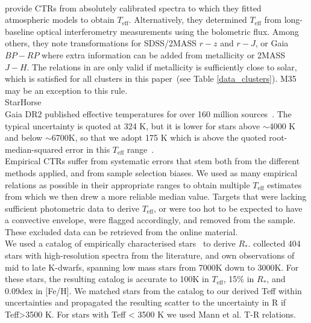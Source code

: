 \documentclass{aa}
\begin{document}
\\
\citet{mann_how_2015} provide CTRs from absolutely calibrated spectra to which they fitted atmospheric models to obtain $T_\mathrm{eff}$. Alternatively, they determined $T_\mathrm{eff}$ from long-baseline optical interferometry measurements using the bolometric flux. Among others, they note transformations for SDSS/2MASS $r-z$ and $r-J$, or Gaia $BP-RP$ where extra information can be added from metallicity or 2MASS $J-H$. The relations in \citet{mann_how_2015} are only valid if metallicity is sufficiently close to solar, which is satisfied for all clusters in this paper~(see Table \ref{data_clusters}). M35 may be an exception to this rule.
\\
StarHorse
\\
Gaia DR2 published effective temperatures for over 160 million sources~\citep{gaia_dr2_release_2018}. The typical uncertainty is quoted at 324 K, but it is lower for stars above $\sim$4000 K and below $\sim$6700K, so that we adopt 175 K which is above the quoted root-median-squared error in this $T_\mathrm{eff}$ range~\citep{andrae_gaiaapsis_2018}.
\\
Empirical CTRs suffer from systematic errors that stem both from the different methods applied, and from sample selection biases. We used as many empirical relations as possible in their appropriate ranges to obtain multiple $T_\mathrm{eff}$ estimates from which we then drew a more reliable median value. Targets that were lacking sufficient photometric data to derive $T_\mathrm{eff}$, or were too hot to be expected to have a convective envelope, were flagged accordingly, and removed from the sample. These excluded data can be retrieved from the online material.
\\
We used a catalog of empirically characterised stars~\citep{yee_specmatch_2017} to derive $R_*$. \citet{yee_specmatch_2017} collected 404 stars with high-resolution spectra from the literature, and own observations of mid to late K-dwarfs, spanning low mass stars from 7000\;K down to 3000\;K. For these stars, the resulting catalog is accurate to 100\;K in
$T_\mathrm{eff}$, 15\;\% in $R_*$, and 0.09\;dex in [Fe/H]. We matched stars from the catalog to our derived Teff within uncertainties and propagated the resulting scatter to the uncertainty in R if Teff>3500 K. For stars with Teff < 3500 K we used Mann et al. T-R relations.
\\
\end{document}
